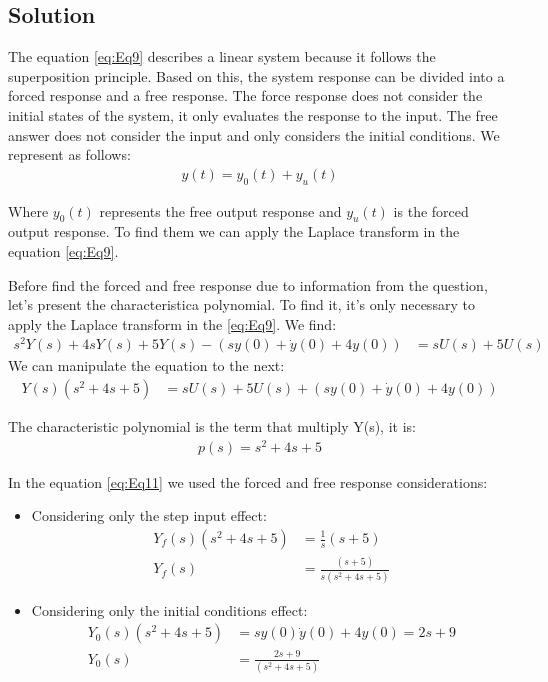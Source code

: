 \documentclass[a4paper,11pt]{article}
\begin{document}
\subsection*{Solution} 
\par The equation \eqref{eq:Eq9} describes a linear system because it follows the superposition principle. Based on this, the system response can be divided into a forced response and a free response. The force response does not consider the initial states of the system, it only evaluates the response to the input. The free answer does not consider the input and only considers the initial conditions. We represent as follows:
\begin{align*}
y(t) = y_0(t) + y_u(t)
\end{align*}
\par Where $y_0(t)$ represents the free output response and $y_u(t)$ is the forced output response. To find them we can apply the Laplace transform in the equation \eqref{eq:Eq9}.
\par Before find the forced and free response due to information from the question, let's present the characteristica polynomial. To find it, it's only necessary to apply the Laplace transform in the \eqref{eq:Eq9}. We find:  
\begin{align*}
s^2Y(s)+4sY(s)+5Y(s)-(sy(0)+\dot{y}{(0)}+4y(0))&= sU(s)+5U(s)
\end{align*}
We can manipulate the equation to the next:
\begin{align}
\label{eq:Eq11}
Y(s)(s^2+4s+5)&= sU(s)+5U(s)+(sy(0)+\dot{y}{(0)}+4y(0))
\end{align}
\par The characteristic polynomial is the term that multiply Y(s), it is:
\begin{align}
\label{eq:Eq12}
p(s)=s^2+4s+5
\end{align}
\par In the equation \eqref{eq:Eq11} we used the forced and free response considerations: 
\begin{itemize}
\item Considering only the step input effect:
\begin{align*}
Y_f(s)(s^2+4s+5) &=\frac{1}{s}(s+5)\\
Y_f(s) &= \frac{(s+5)}{s(s^2+4s+5)}
\end{align*}
\item Considering only the initial conditions effect:
\begin{align*}
Y_0(s)(s^2+4s+5) &= sy(0) \dot{y}(0)+4y(0)=2s+9\\
Y_0(s) &=\frac{2s+9}{(s^2+4s+5)}
\end{align*}
\end{itemize}
\end{document}
